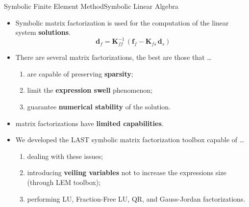 \begin{frame}{Symbolic Finite Element Method}{Symbolic Linear Algebra}
  \begin{itemize}
    \item Symbolic matrix factorization is used for the computation of the linear system \textbf{solutions}.
    \begin{equation*}
      \mathbf{d}_{f} = \mathbf{K}_{f\!f}^{-1}\,\left(\mathbf{f}_{f} - \mathbf{K}_{f\!s}\,\mathbf{d}_{s}\right)
    \end{equation*}
    \item There are several matrix factorizations, the best are those that \dots
    \begin{enumerate}
      \item are capable of preserving \textbf{sparsity};
      \item limit the \textbf{expression swell} phenomenon;
      \item guarantee \textbf{numerical stability} of the solution.
    \end{enumerate}
    \item \Maple{} matrix factorizations have \textbf{limited capabilities}.
    \item We developed the \acs{LAST} symbolic matrix factorization toolbox capable of \dots
    \begin{enumerate}
      \item dealing with these \Maple{} issues;
      \item introducing \textbf{veiling variables} not to increase the expressions size (through \acs{LEM} toolbox);
      \item performing LU, Fraction-Free LU, QR, and Gauss-Jordan factorizations.
    \end{enumerate}
  \end{itemize}
\end{frame}

